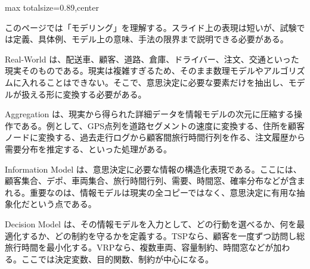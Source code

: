 \begin{minipage}[t]{0.58\textwidth}
\begin{adjustbox}{max totalsize={\textwidth}{0.89\textheight},center}
\begin{minipage}{\textwidth}\scriptsize
{}このページでは「モデリング」を理解する。スライド上の表現は短いが、試験では定義、具体例、モデル上の意味、手法の限界まで説明できる必要がある。\par
Real-World は、配送車、顧客、道路、倉庫、ドライバー、注文、交通といった現実そのものである。現実は複雑すぎるため、そのまま数理モデルやアルゴリズムに入れることはできない。そこで、意思決定に必要な要素だけを抽出し、モデルが扱える形に変換する必要がある。\par
Aggregation は、現実から得られた詳細データを情報モデルの次元に圧縮する操作である。例として、GPS点列を道路セグメントの速度に変換する、住所を顧客ノードに変換する、過去走行ログから顧客間旅行時間行列を作る、注文履歴から需要分布を推定する、といった処理がある。\par
Information Model は、意思決定に必要な情報の構造化表現である。ここには、顧客集合、デポ、車両集合、旅行時間行列、需要、時間窓、確率分布などが含まれる。重要なのは、情報モデルは現実の全コピーではなく、意思決定に有用な抽象化だという点である。\par
Decision Model は、その情報モデルを入力として、どの行動を選べるか、何を最適化するか、どの制約を守るかを定義する。TSPなら、顧客を一度ずつ訪問し総旅行時間を最小化する。VRPなら、複数車両、容量制約、時間窓などが加わる。ここでは決定変数、目的関数、制約が中心になる。\par

\end{minipage}
\end{adjustbox}
\end{minipage}
